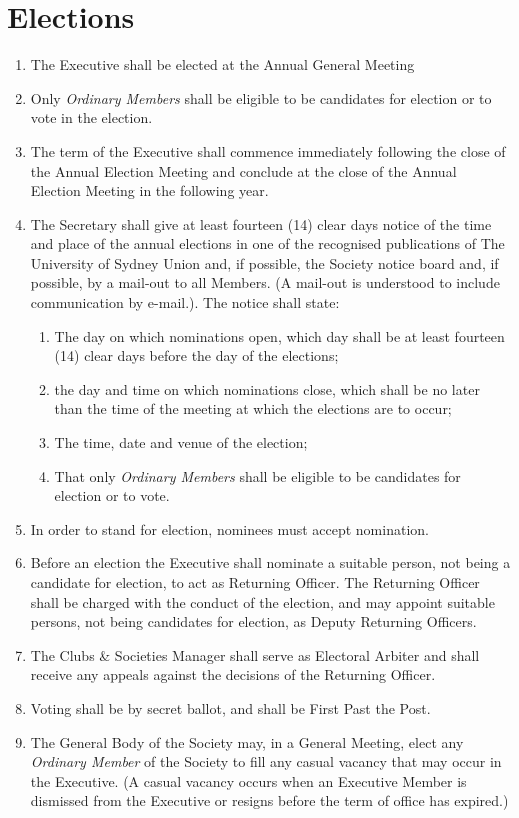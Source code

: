 \documentclass[11pt]{article}
\begin{document}
\section{Elections}
\begin{enumerate}[\thesection .1]
    \item The Executive shall be elected at the Annual General Meeting 
    \item Only \textit{Ordinary Members} shall be eligible to be candidates for election or to vote in the election.
    \item The term of the Executive shall commence immediately following the close of the Annual Election Meeting and conclude at the close of the Annual Election Meeting in the following year.
    \item The Secretary shall give at least fourteen (14) clear days notice of the time and place of the annual elections in one of the recognised publications of The University of Sydney Union and, if possible, the Society notice board and, if possible, by a mail-out to all Members. (A mail-out is understood to include communication by e-mail.).  The notice shall state:
    \begin{enumerate}[\hspace{5mm}i.]
        \item The day on which nominations open, which day shall be at least fourteen (14) clear days before the day of the elections;
        \item  the day and time on which nominations close, which shall be no later than the time of the meeting at which the elections are to occur;
        \item The time, date and venue of the election;
        \item That only \textit{Ordinary Members} shall be eligible to be candidates for election or to vote.
    \end{enumerate}
    \item In order to stand for election, nominees must accept nomination.
    \item Before an election the Executive shall nominate a suitable person, not being a candidate for election, to act as Returning Officer. The Returning Officer shall be charged with the conduct of the election, and may appoint suitable persons, not being candidates for election, as Deputy Returning Officers.
    \item The Clubs \& Societies Manager shall serve as Electoral Arbiter and shall receive any appeals against the decisions of the Returning Officer.
    \item Voting shall be by secret ballot, and shall be First Past the Post.
    \item The General Body of the Society may, in a General Meeting, elect any \textit{Ordinary Member} of the Society to fill any casual vacancy that may occur in the Executive. (A casual vacancy occurs when an Executive Member is dismissed from the Executive or resigns before the term of office has expired.)
\end{enumerate}
\end{document}
